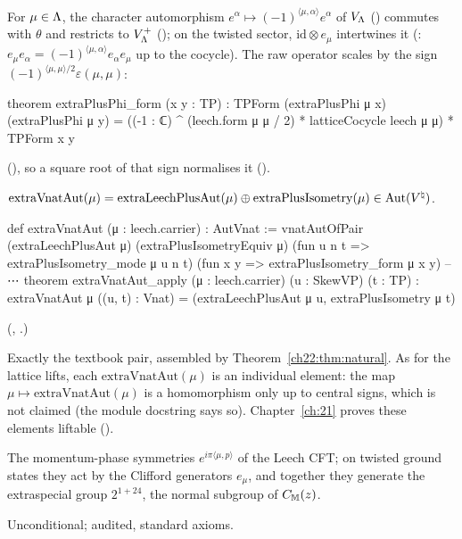 For $\mu\in{\Lambda}$, the character automorphism $e^\alpha\mapsto(-1)^{\langle\mu,\alpha\rangle}e^\alpha$ of $V_{\Lambda}$
() commutes with $\theta$ and restricts to $V_{\Lambda}^+$ (); on the twisted
sector, $\mathrm{id}\otimes e_\mu$ intertwines it (: $e_\mu e_\alpha=(-1)^{\langle\mu,\alpha\rangle}
e_\alpha e_\mu$ up to the cocycle).  The raw operator scales  by the sign
$(-1)^{\langle\mu,\mu\rangle/2}\varepsilon(\mu,\mu)$:
\begin{leancode}
theorem extraPlusPhi_form (x y : TP) :
    TPForm (extraPlusPhi μ x) (extraPlusPhi μ y)
      = ((-1 : ℂ) ^ (leech.form μ μ / 2) * latticeCocycle leech μ μ) * TPForm x y
\end{leancode}
(), so a square root of that sign normalises it
().

\begin{definition}\label{ch22:def:extra}
$\mathrm{extraVnatAut}(\mu)=\mathrm{extraLeechPlusAut}(\mu)\oplus\mathrm{extraPlusIsometry}(\mu)\in\operatorname{Aut}({V^{\natural}})$.
\end{definition}
\begin{leancode}
def extraVnatAut (μ : leech.carrier) : AutVnat :=
  vnatAutOfPair (extraLeechPlusAut μ) (extraPlusIsometryEquiv μ)
    (fun u n t => extraPlusIsometry_mode μ u n t) (fun x y => extraPlusIsometry_form μ x y)
-- ⋯
theorem extraVnatAut_apply (μ : leech.carrier) (u : SkewVP) (t : TP) :
    extraVnatAut μ ((u, t) : Vnat) = (extraLeechPlusAut μ u, extraPlusIsometry μ t)
\end{leancode}
(, .)
\begin{dictionary}
Exactly the textbook pair, assembled by Theorem~\ref{ch22:thm:natural}.  As for the lattice lifts, each
$\mathrm{extraVnatAut}(\mu)$ is an individual element: the map $\mu\mapsto\mathrm{extraVnatAut}(\mu)$ is a
homomorphism only up to central signs, which is not claimed (the module docstring says so).
Chapter~\ref{ch:21} proves these elements liftable ().
\end{dictionary}
\begin{physics}
The momentum-phase symmetries $e^{i\pi\langle\mu,p\rangle}$ of the Leech CFT; on twisted ground states they act by the
Clifford generators $e_\mu$, and together they generate the extraspecial group $2^{1+24}$, the normal subgroup of
$C_{\mathbb{M}}(z)$.
\end{physics}
\begin{status}Unconditional; audited, standard axioms.\end{status}

